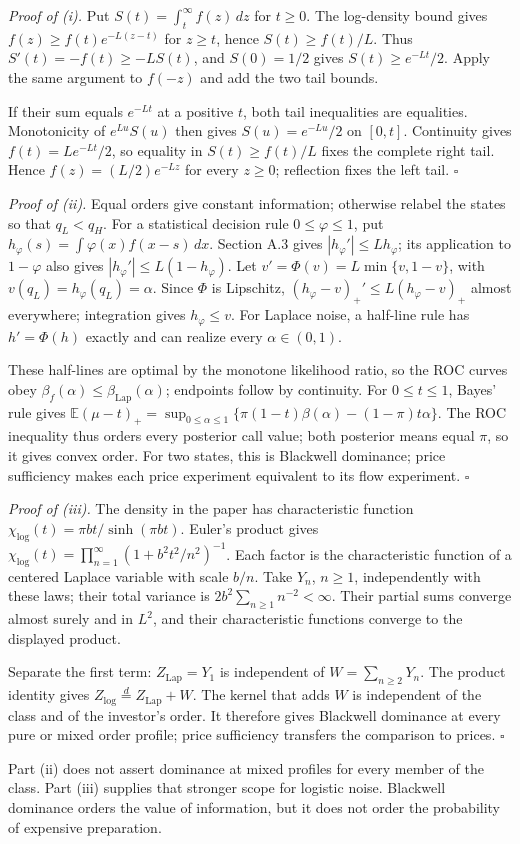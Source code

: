 \emph{Proof of (i).} Put \(S(t)=\int_t^\infty f(z)\,dz\) for \(t\ge0\).
The log-density bound gives \(f(z)\ge f(t)e^{-L(z-t)}\) for \(z\ge t\), hence \(S(t)\ge f(t)/L\).
Thus \(S'(t)=-f(t)\ge-LS(t)\), and \(S(0)=1/2\) gives \(S(t)\ge e^{-Lt}/2\).
Apply the same argument to \(f(-z)\) and add the two tail bounds.
\par
If their sum equals \(e^{-Lt}\) at a positive \(t\), both tail inequalities are equalities.
Monotonicity of \(e^{Lu}S(u)\) then gives \(S(u)=e^{-Lu}/2\) on \([0,t]\).
Continuity gives \(f(t)=Le^{-Lt}/2\), so equality in \(S(t)\ge f(t)/L\) fixes the complete right tail.
Hence \(f(z)=(L/2)e^{-Lz}\) for every \(z\ge0\); reflection fixes the left tail. \(\square\)

\emph{Proof of (ii).} Equal orders give constant information; otherwise relabel the states so that \(q_L<q_H\).
For a statistical decision rule \(0\le\varphi\le1\), put \(h_\varphi(s)=\int\varphi(x)f(x-s)\,dx\).
Section A.3 gives \(|h_\varphi'|\le Lh_\varphi\); its application to \(1-\varphi\) also gives \(|h_\varphi'|\le L(1-h_\varphi)\).
Let \(v'=\Phi(v)=L\min\{v,1-v\}\), with \(v(q_L)=h_\varphi(q_L)=\alpha\).
Since \(\Phi\) is Lipschitz, \((h_\varphi-v)_+'\le L(h_\varphi-v)_+\) almost everywhere; integration gives \(h_\varphi\le v\).
For Laplace noise, a half-line rule has \(h'=\Phi(h)\) exactly and can realize every \(\alpha\in(0,1)\).
\par
These half-lines are optimal by the monotone likelihood ratio, so the ROC curves obey \(\beta_f(\alpha)\le\beta_{\mathrm{Lap}}(\alpha)\); endpoints follow by continuity.
For \(0\le t\le1\), Bayes' rule gives \(\mathbb E(\mu-t)_+=\sup_{0\le\alpha\le1}\{\pi(1-t)\beta(\alpha)-(1-\pi)t\alpha\}\).
The ROC inequality thus orders every posterior call value; both posterior means equal \(\pi\), so it gives convex order.
For two states, this is Blackwell dominance; price sufficiency makes each price experiment equivalent to its flow experiment. \(\square\)

\emph{Proof of (iii).} The density in the paper has characteristic function
\(\chi_{\mathrm{log}}(t)=\pi bt/\sinh(\pi bt)\).
Euler's product gives \(\chi_{\mathrm{log}}(t)=\prod_{n=1}^{\infty}(1+b^2t^2/n^2)^{-1}\).
Each factor is the characteristic function of a centered Laplace variable with scale \(b/n\).
Take \(Y_n\), \(n\ge1\), independently with these laws; their total variance is \(2b^2\sum_{n\ge1}n^{-2}<\infty\).
Their partial sums converge almost surely and in \(L^2\), and their characteristic functions converge to the displayed product.
\par
Separate the first term: \(Z_{\mathrm{Lap}}=Y_1\) is independent of \(W=\sum_{n\ge2}Y_n\).
The product identity gives \(Z_{\mathrm{log}}\overset d=Z_{\mathrm{Lap}}+W\).
The kernel that adds \(W\) is independent of the class and of the investor's order.
It therefore gives Blackwell dominance at every pure or mixed order profile; price sufficiency transfers the comparison to prices. \(\square\)

Part (ii) does not assert dominance at mixed profiles for every member of the class.
Part (iii) supplies that stronger scope for logistic noise.
Blackwell dominance orders the value of information, but it does not order the probability of expensive preparation.

